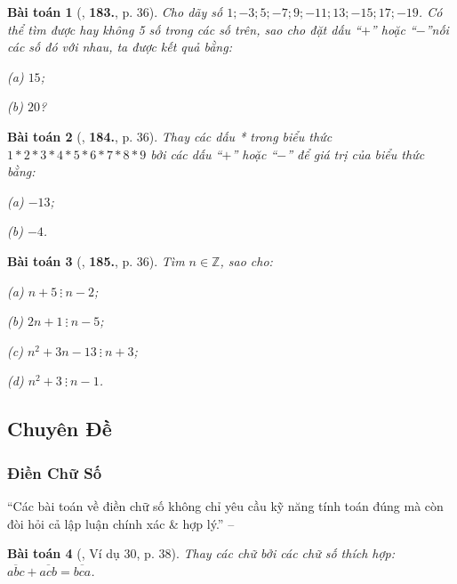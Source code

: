 \documentclass{article}
\numberwithin{equation}{section}
\newtheorem{baitoan}{Bài toán}[section]
\begin{document}
\begin{baitoan}[\cite{Binh_Toan_6_tap_1}, \textbf{183.}, p. 36]
	Cho dãy số $1;-3;5;-7;9;-11;13;-15;17;-19$. Có thể tìm được hay không 5 số trong các số trên, sao cho đặt dấu ``$+$'' hoặc ``$-$''nối các số đó với nhau, ta được kết quả bằng:
	\begin{enumerate*}
		\item[(a)] $15$;
		\item[(b)] $20$?
	\end{enumerate*}
\end{baitoan}

\begin{baitoan}[\cite{Binh_Toan_6_tap_1}, \textbf{184.}, p. 36]
	Thay các dấu * trong biểu thức $1*2*3*4*5*6*7*8*9$ bởi các dấu ``$+$'' hoặc ``$-$'' để giá trị của biểu thức bằng:
	\begin{enumerate*}
		\item[(a)] $-13$;
		\item[(b)] $-4$.
	\end{enumerate*}
\end{baitoan}

\begin{baitoan}[\cite{Binh_Toan_6_tap_1}, \textbf{185.}, p. 36]
	Tìm $n\in\mathbb{Z}$, sao cho:
	\begin{enumerate*}
		\item[(a)] $n + 5\ \vdots\ n - 2$;
		\item[(b)] $2n + 1\ \vdots\ n - 5$;
		\item[(c)] $n^2 + 3n - 13\ \vdots\ n + 3$;
		\item[(d)] $n^2 + 3\ \vdots\ n - 1$.
	\end{enumerate*}
\end{baitoan}

\subsection{Chuyên Đề}

\subsubsection{Điền Chữ Số}
``Các bài toán về điền chữ số không chỉ yêu cầu kỹ năng tính toán đúng mà còn đòi hỏi cả lập luận chính xác \& hợp lý.'' -- \cite[p. 38]{Binh_Toan_6_tap_1}

\begin{baitoan}[\cite{Binh_Toan_6_tap_1}, Ví dụ 30, p. 38]
	Thay các chữ bởi các chữ số thích hợp: $\overline{abc} + \overline{acb} = \overline{bca}$.
\end{baitoan}
\end{document}

